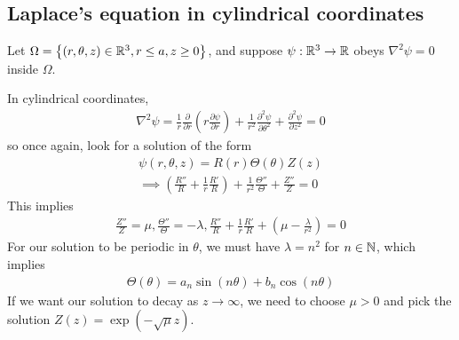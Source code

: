 \documentclass[a4paper]{article}
\begin{document}
\subsection{Laplace's equation in cylindrical coordinates}
Let $\Omega = \left\{\left(r,\theta,z\right) \in \mathbb{R}^3, r\leq a, z\geq 0\right\}$, and suppose $\psi:\mathbb{R}^3 \to \mathbb{R}$ obeys $\nabla^2 \psi = 0$ inside $\Omega$.


In cylindrical coordinates, 
\begin{equation*}
\begin{aligned}
\nabla^2 \psi = \frac{1}{r} \frac{\partial}{\partial r}\left(r \frac{\partial \psi}{\partial r}\right) + \frac{1}{r^2} \frac{\partial^2 \psi}{\partial \theta^2} + \frac{\partial^2 \psi}{\partial z^2} = 0
\end{aligned}
\end{equation*}
so once again, look for a solution of the form
\begin{equation*}
\begin{aligned}
\psi\left(r,\theta,z\right) = R\left(r\right)\Theta\left(\theta\right) Z\left(z\right)\\
\implies \left(\frac{R''}{R} + \frac{1}{r} \frac{R'}{R}\right) + \frac{1}{r^2} \frac{\Theta''}{\Theta} + \frac{Z''}{Z} = 0
\end{aligned}
\end{equation*}
This implies
\begin{equation*}
\begin{aligned}
\frac{Z''}{Z} = \mu, \frac{\Theta''}{\Theta} = -\lambda, \frac{R''}{R} + \frac{1}{r}\frac{R'}{R} + \left(\mu-\frac{\lambda}{r^2}\right) = 0
\end{aligned}
\end{equation*}
For our solution to be periodic in $\theta$, we must have $\lambda = n^2$ for $n \in \mathbb{N}$, which implies
\begin{equation*}
\begin{aligned}
\Theta\left(\theta\right) = a_n \sin\left(n\theta\right) + b_n \cos\left(n\theta\right)
\end{aligned}
\end{equation*}
If we want our solution to decay as $z \to \infty$, we need to choose $\mu >0$ and pick the solution $Z\left(z\right) = \exp\left(-\sqrt{\mu}z\right)$.
\end{document}
